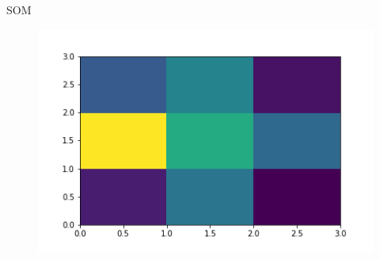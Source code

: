 \documentclass[12pt]{beamer}
\begin{document}
\begin{frame}{SOM}
\begin{figure}
\includegraphics[scale=0.2]{../distance_map_som}
\end{figure}

\begin{figure}
\end{figure}
\end{frame}
\end{document}
